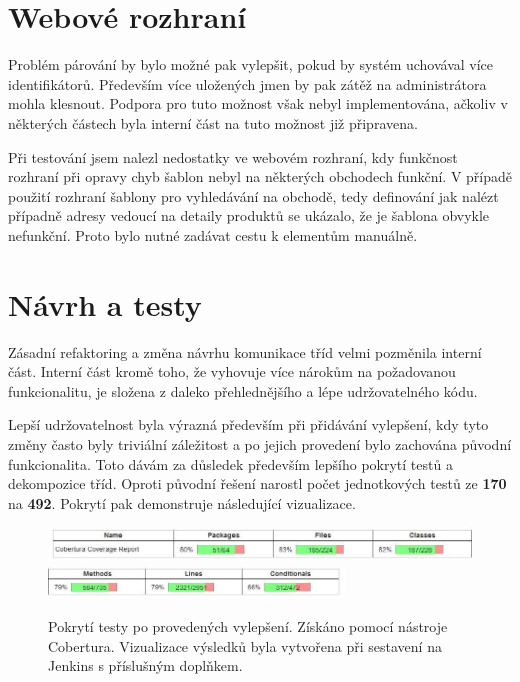 \documentclass[thesis=B,czech]{FITthesis}[2012/06/26]
\begin{document}
\section{Webové rozhraní}
Problém párování by bylo možné pak vylepšit, pokud by systém uchovával více identifikátorů. Především více uložených jmen by pak zátěž na administrátora mohla klesnout. Podpora pro tuto možnost však nebyl implementována, ačkoliv v některých částech byla interní část na tuto možnost
již připravena.
\par
Při testování jsem nalezl nedostatky ve webovém rozhraní, kdy funkčnost rozhraní při opravy chyb šablon nebyl na některých obchodech funkční.
V případě použití rozhraní šablony pro vyhledávání na obchodě, tedy definování jak nalézt případně adresy vedoucí na detaily produktů se
ukázalo, že je šablona obvykle nefunkční. Proto bylo nutné zadávat cestu k elementům manuálně.
\par

\section{Návrh a testy}
Zásadní refaktoring a změna návrhu komunikace tříd velmi pozměnila interní část. Interní část kromě toho, že vyhovuje
více nárokům na požadovanou funkcionalitu, je složena z daleko přehlednějšího a lépe udržovatelného kódu. 
\par
Lepší udržovatelnost byla výrazná především při přidávání vylepšení, kdy tyto změny často byly triviální záležitost a po jejich provedení
bylo zachována původní funkcionalita. Toto dávám za důsledek především lepšího pokrytí testů a dekompozice tříd. Oproti původní řešení narostl počet jednotkových testů ze \textbf{170} na \textbf{492}. Pokrytí pak demonstruje následující vizualizace.

\begin{figure}[h]\centering
 	\includegraphics[width=1.0\textwidth]{resources/cobertura-report-new-1}
 	\includegraphics[width=0.7\textwidth]{resources/cobertura-report-new-2}
	\caption[Pokrytí testy po provedených vylepšení]{Pokrytí testy po provedených vylepšení. Získáno pomocí nástroje Cobertura. Vizualizace
	výsledků byla vytvořena při sestavení na Jenkins s příslušným doplňkem.}\label{fig:cober-new}
\end{figure}
\end{document}
